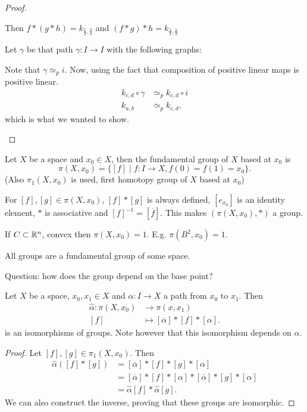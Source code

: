 \begin{proof}
\begin{itemize}
            Then $f*(g*h) = k_{\frac{1}{2}, \frac{3}{4}}$ and $(f*g)*h = k_{\frac{1}{4}, \frac{1}{2}}$

            Let $\gamma$ be that path $\gamma:I \to  I$ with the following graphs:

            Note  that $\gamma \simeq_p i$.
            Now, using the fact that composition of positive linear maps is positive linear.
            \begin{align*}
                k_{c, d}  \circ  \gamma &\simeq_p  k_{c, d}  \circ i\\
                k_{a, b} &\simeq_p  k_{c, d},
            \end{align*} 
            which is what we wanted to show.
    \end{itemize}
\end{proof}


\begin{definition}
    Let $X$ be a space and $x_0 \in X$, then the fundamental group of $X$ based at $x_0$ is
    \[
        \pi(X, x_0) = \{ [f]  \mid  f : I \to X, f(0) = f(1) = x_0\} 
    .\] 
    (Also $\pi_1(X, x_0)$ is used, first homotopy group of $X$ based at $x_0$)

    For $[f], [g] \in \pi(X, x_0)$, $[f] * [g]$ is always defined,  $[e_{x_0}]$ is an identity element, $*$ is associative and $[f]^{-1} = [\overline{f}]$. This makes $(\pi(X, x_0), *)$ a group.
\end{definition}
\begin{eg}
    If $C \subset \mathbb{R}^n$, convex then $\pi(X, x_0) = 1$.
    E.g. $\pi(B^2, x_0) = 1$.
\end{eg}

\begin{remark}
    All groups are a fundamental group of some space.
\end{remark}

Question: how does the group depend on  the base point?

\begin{theorem}[52.1]
    Let $X$ be a space, $x_0, x_1 \in X$ and $\alpha: I \to X$ a path from  $x_0$ to $x_1$.
    Then
    \begin{align*}
        \hat{\alpha}: \pi(X, x_0) &\longrightarrow\pi(x, x_1)\\
        [f] &\longmapsto  [\overline{\alpha}] * [f] * [\alpha]
    .\end{align*}
    is an isomorphisms of groups. Note however that this isomorphism depends on $\alpha$.
\end{theorem}
\begin{proof}
    Let $[f], [g] \in \pi_1(X, x_0)$.
    Then 
    \begin{align*}
        \hat{\alpha}([f]*[g]) &= [\overline{\alpha}] * [f] * [g] * [\alpha]\\
                              &= [\overline{\alpha}] *[f] * [\alpha] * [\overline{\alpha}] * [g] * [\alpha]\\
                              &= \hat{\alpha}[f] * \hat{\alpha}[g]
    .\end{align*}
    We can also construct the inverse, proving that these groups are isomorphic.
\end{proof}

